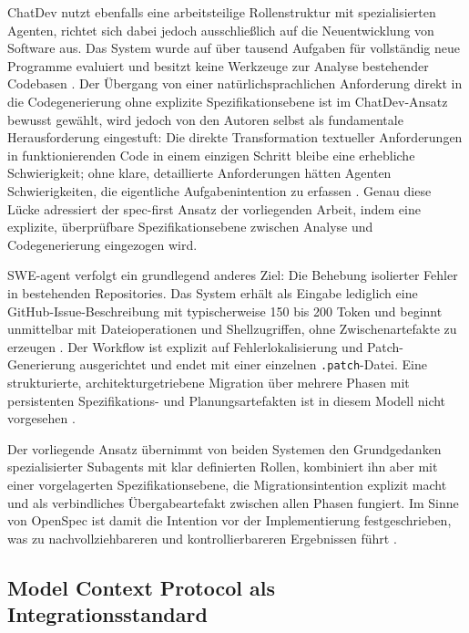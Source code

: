 ChatDev nutzt ebenfalls eine arbeitsteilige Rollenstruktur mit spezialisierten Agenten, richtet sich dabei jedoch ausschließlich auf die Neuentwicklung von Software aus. Das System wurde auf über tausend Aufgaben für vollständig neue Programme evaluiert und besitzt keine Werkzeuge zur Analyse bestehender Codebasen \parencite{qian2024chatdev}. Der Übergang von einer natürlichsprachlichen Anforderung direkt in die Codegenerierung ohne explizite Spezifikationsebene ist im ChatDev-Ansatz bewusst gewählt, wird jedoch von den Autoren selbst als fundamentale Herausforderung eingestuft: Die direkte Transformation textueller Anforderungen in funktionierenden Code in einem einzigen Schritt bleibe eine erhebliche Schwierigkeit; ohne klare, detaillierte Anforderungen hätten Agenten Schwierigkeiten, die eigentliche Aufgabenintention zu erfassen \parencite{qian2024chatdev}. Genau diese Lücke adressiert der spec-first Ansatz der vorliegenden Arbeit, indem eine explizite, überprüfbare Spezifikationsebene zwischen Analyse und Codegenerierung eingezogen wird.

SWE-agent verfolgt ein grundlegend anderes Ziel: Die Behebung isolierter Fehler in bestehenden Repositories. Das System erhält als Eingabe lediglich eine GitHub-Issue-Beschreibung mit typischerweise 150 bis 200 Token und beginnt unmittelbar mit Dateioperationen und Shellzugriffen, ohne Zwischenartefakte zu erzeugen \parencite{yang2024sweagent,rodriguezcardenas2026behelm}. Der Workflow ist explizit auf Fehlerlokalisierung und Patch-Generierung ausgerichtet und endet mit einer einzelnen \texttt{.patch}-Datei. Eine strukturierte, architekturgetriebene Migration über mehrere Phasen mit persistenten Spezifikations- und Planungsartefakten ist in diesem Modell nicht vorgesehen \parencite{yang2024sweagent}.

Der vorliegende Ansatz übernimmt von beiden Systemen den Grundgedanken spezialisierter Subagents mit klar definierten Rollen, kombiniert ihn aber mit einer vorgelagerten Spezifikationsebene, die Migrationsintention explizit macht und als verbindliches Übergabeartefakt zwischen allen Phasen fungiert. Im Sinne von OpenSpec ist damit die Intention vor der Implementierung festgeschrieben, was zu nachvollziehbareren und kontrollierbareren Ergebnissen führt \parencite{openspec}.

\subsection{Model Context Protocol als Integrationsstandard}

